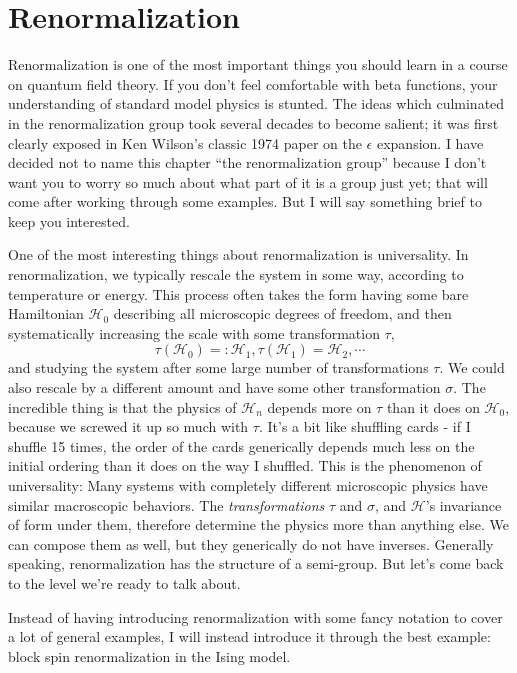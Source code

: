 \documentclass[main.tex]{subfiles}
\begin{document}
\chapter{Renormalization}
Renormalization is one of the most important things you should learn in a course on quantum field theory. If you don't feel comfortable with beta functions, your understanding of standard model physics is stunted. The ideas which culminated in the renormalization group took several decades to become salient; it was first clearly exposed in Ken Wilson's classic 1974 paper on the $\epsilon$ expansion. I have decided not to name this chapter ``the renormalization group'' because I don't want you to worry so much about what part of it is a group just yet; that will come after working through some examples. But I will say something brief to keep you interested. 

One of the most interesting things about renormalization is universality. In renormalization, we typically rescale the system in some way, according to temperature or energy. This process often takes the form having some bare Hamiltonian $\mathcal{H}_0$ describing all microscopic degrees of freedom, and then systematically increasing the scale with some transformation $\tau$,
\[
\tau(\mathcal{H}_0) =: \mathcal{H}_1, \tau(\mathcal{H}_1) = \mathcal{H}_2, \cdots
\]
and studying the system after some large number of transformations $\tau$. We could also rescale by a different amount and have some other transformation $\sigma$. The incredible thing is that the physics of $\mathcal{H}_n$ depends more on $\tau$ than it does on $\mathcal{H}_0$, because we screwed it up so much with $\tau$. It's a bit like shuffling cards - if I shuffle 15 times, the order of the cards generically depends much less on the initial ordering than it does on the way I shuffled. This is the phenomenon of universality: Many systems with completely different microscopic physics have similar macroscopic behaviors. The \textit{transformations} $\tau$ and $\sigma$, and $\mathcal{H}$'s invariance of form under them, therefore determine the physics more than anything else. We can compose them as well, but they generically do not have inverses. Generally speaking, renormalization has the structure of a semi-group. But let's come back to the level we're ready to talk about.

Instead of having introducing renormalization with some fancy notation to cover a lot of general examples, I will instead introduce it through the best example: block spin renormalization in the Ising model.
\end{document}
